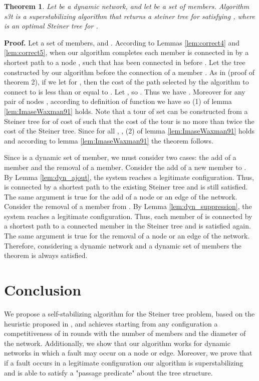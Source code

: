 \documentclass[11pt]{article}
\newtheorem{theorem}{Theorem}
\newenvironment{proof}{\noindent \begin{rm}{\textbf{Proof.} }}{\hspace*{\fill}\par\end{rm} \vspace{.3cm}}
\newcommand{\STT}{{\sc s3t}}
\begin{document}
\begin{theorem}\label{theo1}
Let  be a dynamic network, and let  be a set of members. Algorithm \STT\/ is a superstabilizing algorithm that returns a steiner tree  for  satisfying
,  where  is an optimal Steiner tree for .
\end{theorem}

\begin{proof}
Let a set  of members, and . According to Lemmas \ref{lem:correct4} and \ref{lem:correct5}, when our algorithm completes each member  is connected in  by a shortest path to a node , such that  has been connected in  before . Let  the tree constructed by our algorithm before the connection of a member . As in \cite{ImaseWaxman91} (proof of theorem 2), if we let  for , then the cost of the path selected by the algorithm to connect  to  is less than or equal to . Let , so . Thus we have . Moreover for any pair of nodes , according to definition of function  we have  so (1) of lemma \ref{lem:ImaseWaxman91} holds. Note that a tour of set  can be constructed from a Steiner tree for  of cost of  such that the cost of the tour is no more than twice the cost of the Steiner tree. Since  for all , , (2) of lemma \ref{lem:ImaseWaxman91} holds and according to lemma \ref{lem:ImaseWaxman91} the theorem follows.

Since  is a dynamic set of member, we must consider two cases: the add of a member and the removal of a member. Consider the add of a new member  to . By Lemma \ref{lem:dyn_ajout}, the system reaches a legitimate configuration. Thus,  is connected by a shortest path to the existing Steiner tree and  is still satisfied. The same argument is true for the add of a node or an edge of the network. Consider the removal of a member  from . By Lemma \ref{lem:dyn_suppression}, the system reaches a legitimate configuration. Thus, each member  of  is connected by a shortest path to a connected member in the Steiner tree and  is satisfied again. The same argument is true for the removal of a node or an edge of the network. Therefore, considering a dynamic network  and a dynamic set of members the theorem is always satisfied.
\end{proof}

\section{Conclusion}

We propose a self-stabilizing algorithm for the Steiner tree problem, based on the heuristic proposed in \cite{ImaseWaxman91}, and achieves starting from any configuration a competitiveness of  in  rounds with  the number of members and  the diameter of the network. Additionally, we show that our algorithm works for dynamic networks in which a fault may occur on a node or edge. Moreover, we prove that if a fault occurs in a legitimate configuration our algorithm is superstabilizing and is able to satisfy a "passage predicate" about the tree structure.
\end{document}
